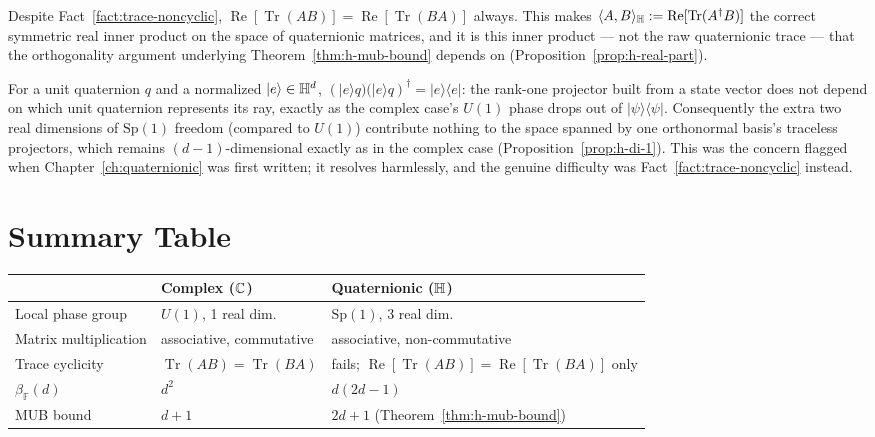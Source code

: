\begin{fact}
\label{fact:trace-real-cyclic}
Despite Fact~\ref{fact:trace-noncyclic}, $\operatorname{Re}[\operatorname{Tr}
(AB)] = \operatorname{Re}[\operatorname{Tr}(BA)]$ always. This makes
$\langle A,B\rangle_{\mathbb{H}} := \operatorname{Re}[\operatorname{Tr}(A^\dagger
B)]$ the correct symmetric real inner product on the space of
quaternionic matrices, and it is this inner product — not the raw
quaternionic trace — that the orthogonality argument underlying
Theorem~\ref{thm:h-mub-bound} depends on
(Proposition~\ref{prop:h-real-part}).
\end{fact}

\begin{fact}
For a unit quaternion $q$ and a normalized $|e\rangle \in \mathbb{H}^d$,
$(|e\rangle q)(|e\rangle q)^\dagger = |e\rangle\langle e|$: the rank-one
projector built from a state vector does not depend on which unit
quaternion represents its ray, exactly as the complex case's $U(1)$ phase
drops out of $|\psi\rangle\langle\psi|$. Consequently the extra two real
dimensions of $\mathrm{Sp}(1)$ freedom (compared to $U(1)$) contribute
nothing to the space spanned by one orthonormal basis's traceless
projectors, which remains $(d-1)$-dimensional exactly as in the complex
case (Proposition~\ref{prop:h-di-1}). This was the concern flagged when
Chapter~\ref{ch:quaternionic} was first written; it resolves harmlessly,
and the genuine difficulty was Fact~\ref{fact:trace-noncyclic} instead.
\end{fact}

\section{Summary Table}

\begin{center}
\begin{tabular}{@{}lll@{}}
\toprule
& Complex ($\mathbb{C}$) & Quaternionic ($\mathbb{H}$) \\
\midrule
Local phase group & $U(1)$, 1 real dim. & $\mathrm{Sp}(1)$, 3 real dim. \\
Matrix multiplication & associative, commutative & associative, non-commutative \\
Trace cyclicity & $\operatorname{Tr}(AB)=\operatorname{Tr}(BA)$ & fails; $\operatorname{Re}[\operatorname{Tr}(AB)]=\operatorname{Re}[\operatorname{Tr}(BA)]$ only \\
$\beta_{\mathbb F}(d)$ & $d^2$ & $d(2d-1)$ \\
MUB bound & $d+1$ & $2d+1$ (Theorem~\ref{thm:h-mub-bound}) \\
\bottomrule
\end{tabular}
\end{center}
